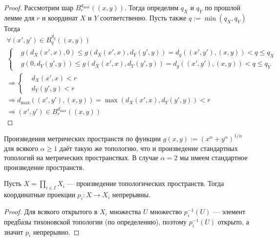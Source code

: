 \documentclass[12pt,a4paper]{article}
\begin{document}
\begin{proof}
        Рассмотрим шар $B_r^{d_{\max}}((x, y))$. Тогда определим $q_X$ и $q_Y$ по прошлой лемме для $r$ и координат $X$ и $Y$ соответственно. Пусть также $q := \min(q_X, q_Y)$ Тогда
        \begin{multline*}
            \forall (x', y') \in B_q^{d_g}((x, y))\\
                \left\{
                    \begin{aligned}
                        &g(d_X(x', x), 0) \leqslant g(d_X(x', x), d_Y(y', y)) = d_g((x', y'), (x, y)) < q \leqslant q_X\\
                        &g(0, d_Y(y', y)) \leqslant g(d_X(x', x), d_Y(y', y)) = d_g((x', y'), (x, y)) < q \leqslant q_Y
                    \end{aligned}
                \right.\\
            \Longrightarrow
            \left\{
                \begin{aligned}
                    &d_X(x', x) < r\\
                    &d_Y(y', y) < r
                \end{aligned}
            \right.\\
            \Longrightarrow d_{\max}((x', y'), (x, y)) = \max(d_X(x', x), d_Y(y', y)) < r\\
            \Longrightarrow (x', y') \in B_r^{d_{\max}}((x, y))
        \end{multline*}
    \end{proof}

    \begin{corollary}
        Произведения метрических пространств по функции $g(x, y) := (x^\alpha + y^\alpha)^{1/\alpha}$ для всякого $\alpha \geqslant 1$ даёт такую же топологию, что и произведение стандартных топологий на метрических пространствах. В случае $\alpha = 2$ мы имеем стандартное произведение пространств.
    \end{corollary}

    \begin{theorem}
        Пусть $X = \prod_{i \in I} X_i$ --- произведение топологических пространств. Тогда координатные проекции $p_i: X \to X_i$ непрерывны.
    \end{theorem}

    \begin{proof}
        Для всякого открытого в $X_i$ множества $U$ множество $p_i^{-1}(U)$ --- элемент предбазы тихоновской топологии (по определению), поэтому $p_i^{-1}(U)$ открыто, а значит $p_i$ непрерывно.
    \end{proof}
\end{document}
